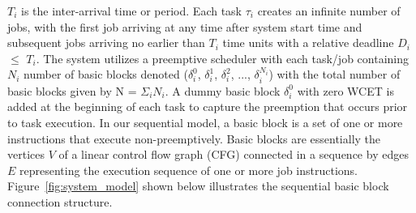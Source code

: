 \begin{math}T_{i}\end{math} is the inter-arrival time or period.
Each task \begin{math}\tau_{i}\end{math} creates an infinite number of jobs, with the first job arriving at any time after system start time and subsequent jobs arriving no earlier than \begin{math}T_{i}\end{math} time units with a relative deadline \begin{math}D_{i}\end{math} \begin{math}\leq\end{math} \begin{math}T_{i}\end{math}.  The system utilizes a preemptive scheduler with each task/job containing \begin{math}N_{i}\end{math} number of basic blocks denoted (\begin{math}\delta_{i}^{0}\end{math}, \begin{math}\delta_{i}^{1}\end{math}, \begin{math}\delta_{i}^{2}\end{math}, ..., \begin{math}\delta_{i}^{N_{i}}\end{math}) with the total number of basic blocks given by N = \begin{math}\Sigma_{i}\end{math}\begin{math}N_{i}\end{math}. A dummy basic block \begin{math}\delta_{i}^{0}\end{math} with zero WCET is added at the beginning of each task to capture the preemption that occurs prior to task execution.  In our sequential model, a basic block is a set of one or more instructions that execute non-preemptively.  Basic blocks are essentially the vertices $V$ of a linear control flow graph (CFG) connected in a sequence by edges $E$ representing the execution sequence of one or more job instructions. Figure~\ref{fig:system_model} shown below illustrates the sequential basic block connection structure.
